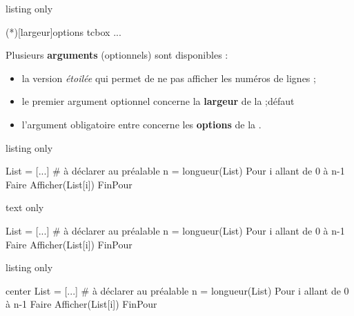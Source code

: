 \documentclass[a4paper,french,11pt]{article}
\newcommand\ctex[1]{\tcbox[vignettelatex]{#1}}
\newcommand\cmaj[1]{%
	{\tcbox[vignetteMaJ]{#1}\xspace}%
}
\newcommand\Cle[1]{{\bfseries\sffamily\textlangle #1\textrangle}}
\begin{document}
\begin{PresCodeTexPL}{listing only}
\begin{PseudoCodeAlt}(*)[largeur]{options tcbox}
...
\end{PseudoCodeAlt}
\end{PresCodeTexPL}

\begin{cautionblock}
Plusieurs \Cle{arguments} (optionnels) sont disponibles :

\begin{itemize}
	\item la version \textit{étoilée} qui permet de ne pas afficher les numéros de lignes ;
	\item le premier argument optionnel concerne la \Cle{largeur} de la \ctex{tcbox} ;\hfill{}défaut \Cle{12cm}
	\item \cmaj{2.5.8} l'argument obligatoire entre \ctex{\{...\}} concerne les \Cle{options} de la \ctex{tcbox}.
\end{itemize}
\vspace*{-\baselineskip}\leavevmode
\end{cautionblock}

\begin{PresCodeTexPL}{listing only}
\begin{PseudoCode}{} %
List = [...]          # à déclarer au préalable
n = longueur(List)
Pour i allant de 0 à n-1 Faire
	Afficher(List[i])
FinPour
\end{PseudoCode}
\end{PresCodeTexPL}

\begin{PresCodeSortiePL}{text only}
\begin{PseudoCode}{}
List = [...]          # à déclarer au préalable
n = longueur(List)
Pour i allant de 0 à n-1 Faire
	Afficher(List[i])
FinPour
\end{PseudoCode}
\end{PresCodeSortiePL}

\begin{PresCodeTexPL}{listing only}
\begin{PseudoCodeAlt}[15cm]{center} %
List = [...]          # à déclarer au préalable
n = longueur(List)
Pour i allant de 0 à n-1 Faire
	Afficher(List[i])
FinPour
\end{PseudoCodeAlt}
\end{PresCodeTexPL}
\end{document}
